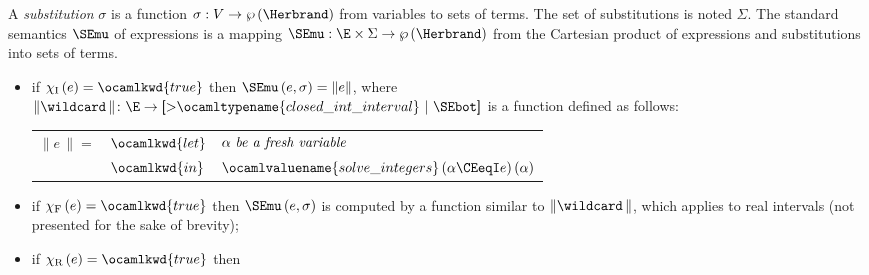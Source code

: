 \begin{Def}\label{semantics_of_SE}
A \emph{substitution} $\sigma$ is a function $\sigma : V \rightarrow
\wp \,(\Herbrand)$ from vari\-ables to sets of terms. The set of
substitutions is noted $\Sigma$. The standard semantics $\SEmu$ of
expressions is a mapping $\SEmu : \E \times \Sigma \rightarrow \wp \,
(\Herbrand)$ from the Cartesian product of expressions and
substitutions into sets of terms.
\end{Def}
\begin{itemize}

  \item 
    if $\chi_{\textnormal{I}} \, (e) = \ocamlkwd{true}$ then $\SEmu \,
    (e, \sigma) = \|e\|$, where\\ $\| \wildcard \,\| \colon \E
    \rightarrow \textsf{[$>$}
      \ocamltypename{clo\-sed\_int\_in\-ter\-val} \,\, \textsf{$\mid$}
      \,\, \SEbot \textsf{]}$ is a function defined as follows:

    \begin{center}
    \begin{tabular}{lll}
        $\| e \,\| =$ 
      & \hspace*{-4mm}
        $\ocamlkwd{let}$
      & \hspace*{-4mm}
        $\alpha \,\, \emph{be a fresh variable}$\\
      & \hspace*{-4mm}
        $\ocamlkwd{in}$
      & \hspace{-4mm}
        $\ocamlvaluename{solve\_integers} \, (\alpha \CEeqI e) \,
         (\alpha)$
    \end{tabular}
    \end{center}

  \item 
    if $\chi_{\textnormal{F}} \, (e) = \ocamlkwd{true}$ then $\SEmu \,
    (e, \sigma)$ is computed by a function similar to
    $\|\wildcard\,\|$, which applies to real intervals (not presented
    for the sake of brevity);
 
    \bigskip

  \item 
    if $\chi_{\textnormal{R}} \, (e) = \ocamlkwd{true}$ then


\end{itemize}
